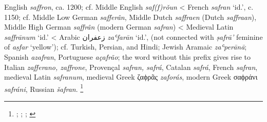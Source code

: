 \begin{etymology}\label{ety:saffron}
English \textit{saffron}, ca. 1200; cf. Middle English \textit{saf(f)rǒun}
< French \textit{safran} `id.', c. 1150; cf. Middle Low German \textit{safferân}, Middle Dutch \textit{saffraen} (Dutch \textit{saffraan}), Middle High German \textit{saffrân} (modern German \textit{safran})
< Medieval Latin \textit{saffrānum} `id.'
< Arabic {زعفران} \textit{zaʿfarān} `id.', (not connected with \textit{ṣafrā'} feminine of \textit{aṣfar} `yellow'); cf. Turkish, Persian, and Hindi; Jewish Aramaic \textit{zaʿperānā}; Spanish \textit{azafran}, Portuguese \textit{açafrão}; the word without this prefix gives rise to Italian \textit{zafferano, zaffrone}, Provençal \textit{safran, safrá}, Catalan \textit{safrá}, French \textit{safran}, medieval Latin \textit{safranum}, medieval Greek ζαϕρᾶς \textit{zaforás}, modern Greek σαϕράνι \textit{safráni}, Russian \textit{šafran}. \footnote{\textcite[s.v. saffron]{oed}; \textcite[saf(f)rǒun]{med}; \textcite[s.v. safran]{tlfi}; \textcite{wehr_dictionary_1976}}
\end{etymology}